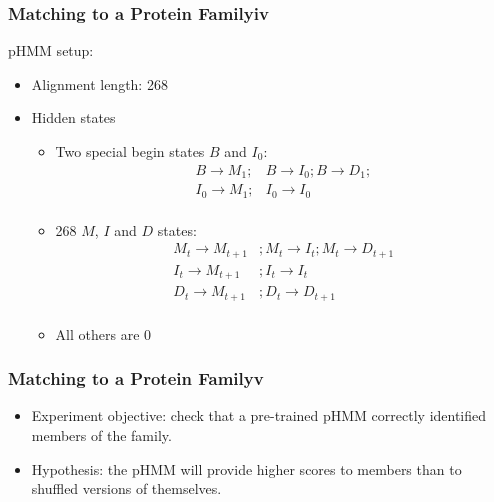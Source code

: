 \documentclass[11pt]{beamer}
\begin{document}
    \begin{frame}
        \frametitle{Matching to a Protein Family\quad iv}
        pHMM setup:
        \begin{itemize}
            \item Alignment length: 268
            \item Hidden states
            \begin{itemize}
                \item Two special begin states $B$ and $I_0$:
                \begin{align*}
                B \rightarrow M_1; &B \rightarrow I_0; B \rightarrow D_1;\\
                I_0 \rightarrow M_1; &I_0 \rightarrow I_0\\
                \end{align*}
                \item 268 $M$, $I$ and $D$ states:
                \begin{align*}
                M_t \rightarrow M_{t+1} &; M_t \rightarrow I_t; M_t \rightarrow D_{t+1}\\
                I_t \rightarrow M_{t+1} &; I_t \rightarrow I_t \\
                D_t \rightarrow M_{t+1} &; D_t \rightarrow D_{t+1} \\
                \end{align*}
                \item All others are 0
            \end{itemize}
        \end{itemize}
    \end{frame}
    
    \begin{frame}
        \frametitle{Matching to a Protein Family\quad v}
        \begin{itemize}
            \item Experiment objective: check that a pre-trained pHMM correctly identified members of the family.
            \item Hypothesis: the pHMM will provide higher scores to members than to shuffled versions of themselves.
            \end{itemize}
    \end{frame}
    
\end{document}
